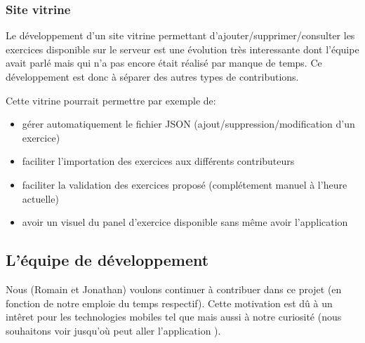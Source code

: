 \subsubsection{Site vitrine}
Le développement d'un site vitrine permettant d'ajouter/supprimer/consulter les exercices disponible sur le serveur est une évolution très interessante dont l'équipe avait parlé mais qui n'a pas encore était réalisé par manque de temps. Ce développement est donc à séparer des autres \og{}types\fg{} de contributions.

Cette vitrine pourrait permettre par exemple de:
\begin{itemize}
    \item gérer automatiquement le fichier JSON (ajout/suppression/modification d'un exercice)
    \item faciliter l'importation des exercices aux différents contributeurs
    \item faciliter la validation des exercices proposé (complétement manuel à l'heure actuelle)
    \item avoir un visuel du panel d'exercice disponible sans même avoir l'application
\end{itemize}


\subsection{L'équipe de développement}
Nous (Romain et Jonathan) voulons continuer à contribuer dans ce projet (en fonction de notre emploie du temps respectif). Cette motivation est dû à un int\^{e}ret pour les technologies mobiles tel que \android{} mais aussi à notre curiosité (nous souhaitons voir jusqu'où peut aller l'application \pepitMobil{}).
